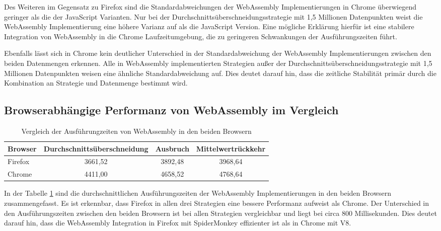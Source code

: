 Des Weiteren im Gegensatz zu Firefox sind die Standardabweichungen der WebAssembly Implementierungen in Chrome überwiegend geringer als die der JavaScript Varianten.
Nur bei der Durchschnittsüberschneidungsstrategie mit 1,5 Millionen Datenpunkten weist die WebAssembly Implementierung eine höhere Varianz auf als die JavaScript Version.
Eine mögliche Erklärung hierfür ist eine stabilere Integration von WebAssembly in die Chrome Laufzeitumgebung, die zu geringeren Schwankungen der Ausführungszeiten führt.

Ebenfalls lässt sich in Chrome kein deutlicher Unterschied in der Standardabweichung der WebAssembly Implementierungen zwischen den beiden Datenmengen erkennen.
Alle in WebAssembly implementierten Strategien außer der Durchschnittsüberschneidungsstrategie mit 1,5 Millionen Datenpunkten weisen eine ähnliche Standardabweichung auf.
Dies deutet darauf hin, dass die zeitliche Stabilität primär durch die Kombination an Strategie und Datenmenge bestimmt wird.

\subsection{Browserabhängige Performanz von WebAssembly im Vergleich}
\label{subsec:BrowserabhängigePerformanzvonWebAssemblyimVergleich}

\begin{table}[H]
    \centering
    \begin{tabular}{lccc}
        \hline
        \textbf{Browser} & \textbf{Durchschnittsüberschneidung} & \textbf{Ausbruch} & \textbf{Mittelwertrückkehr} \\
        \hline
        Firefox & 3661,52 & 3892,48 & 3968,64 \\
        Chrome  & 4411,00 & 4658,52 & 4768,64 \\
        \hline
    \end{tabular}
    \caption{Vergleich der Ausführungzeiten von WebAssembly in den beiden Browsern}
    \label{tab:browser_strategien_wasm}
\end{table}

In der Tabelle \ref{tab:browser_strategien_wasm} sind die durchschnittlichen Ausführungszeiten der WebAssembly Implementierungen in den beiden Browsern zusammengefasst.
Es ist erkennbar, dass Firefox in allen drei Strategien eine bessere Performanz aufweist als Chrome.
Der Unterschied in den Ausführungszeiten zwischen den beiden Browsern ist bei allen Strategien vergleichbar und liegt bei circa 800 Millisekunden.
Dies deutet darauf hin, dass die WebAssembly Integration in Firefox mit SpiderMonkey effizienter ist als in Chrome mit V8.


